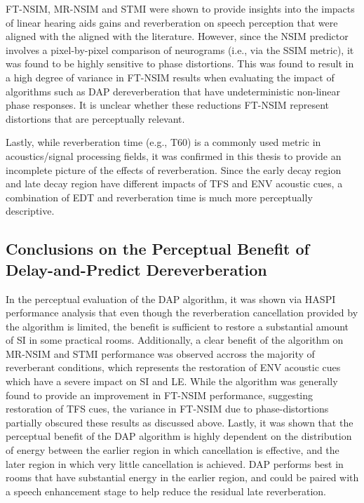 FT-NSIM, MR-NSIM and STMI were shown to provide insights into the impacts of linear hearing aids gains and reverberation on speech perception that were aligned with the aligned with the literature. However, since the NSIM predictor involves a pixel-by-pixel comparison of neurograms (i.e., via the SSIM metric), it was found to be highly sensitive to phase distortions. This was found to result in a high degree of variance in FT-NSIM results when evaluating the impact of algorithms such as DAP dereverberation that have undeterministic non-linear phase responses. It is unclear whether these reductions FT-NSIM represent distortions that are perceptually relevant.

Lastly, while reverberation time (e.g., T60) is a commonly used metric in acoustics/signal processing fields, it was confirmed in this thesis to provide an incomplete picture of the effects of reverberation. Since the early decay region and late decay region have different impacts of TFS and ENV acoustic cues, a combination of EDT and reverberation time is much more perceptually descriptive.

\subsection{Conclusions on the Perceptual Benefit of Delay-and-Predict Dereverberation}

In the perceptual evaluation of the DAP algorithm, it was shown via HASPI performance analysis that even though the reverberation cancellation provided by the algorithm is limited, the benefit is sufficient to restore a substantial amount of SI in some practical rooms. Additionally, a clear benefit of the algorithm on MR-NSIM and STMI performance was observed accross the majority of reverberant conditions, which represents the restoration of ENV acoustic cues which have a severe impact on SI and LE. While the algorithm was generally found to provide an improvement in FT-NSIM performance, suggesting restoration of TFS cues, the variance in FT-NSIM due to phase-distortions partially obscured these results as discussed above. Lastly, it was shown that the perceptual benefit of the DAP algorithm is highly dependent on the distribution of energy between the earlier region in which cancellation is effective, and the later region in which very little cancellation is achieved. DAP performs best in rooms that have substantial energy in the earlier region, and could be paired with a speech enhancement stage to help reduce the residual late reverberation.




